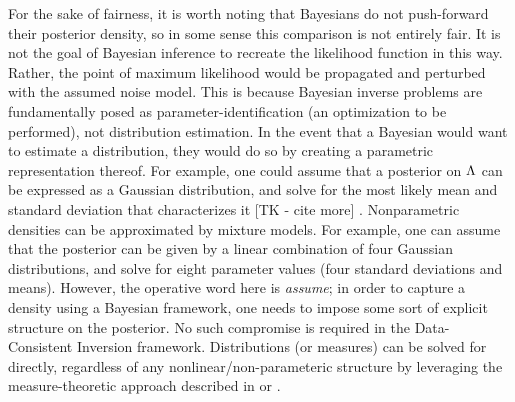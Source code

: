 \begin{ex}
For the sake of fairness, it is worth noting that Bayesians do not push-forward their posterior density, so in some sense this comparison is not entirely fair. 
It is not the goal of Bayesian inference to recreate the likelihood function in this way. 
Rather, the point of maximum likelihood would be propagated and perturbed with the assumed noise model.
This is because Bayesian inverse problems are fundamentally posed as parameter-identification (an optimization to be performed), not distribution estimation.
In the event that a Bayesian would want to estimate a distribution, they would do so by creating a parametric representation thereof.
For example, one could assume that a posterior on ${\Lambda}$ can be expressed as a Gaussian distribution, and solve for the most likely mean and standard deviation that characterizes it [TK - cite more] \cite{Smith}.
Nonparametric densities can be approximated by mixture models. 
For example, one can assume that the posterior can be given by a linear combination of four Gaussian distributions, and solve for eight parameter values (four standard deviations and means). 
However, the operative word here is \emph{assume}; in order to capture a density using a Bayesian framework, one needs to impose some sort of explicit structure on the posterior. 
No such compromise is required in the Data-Consistent Inversion framework.
Distributions (or measures) can be solved for directly, regardless of any nonlinear/non-parameteric structure by leveraging the measure-theoretic approach described in \cite{BE13} or \cite{BJW18}.

\end{ex}